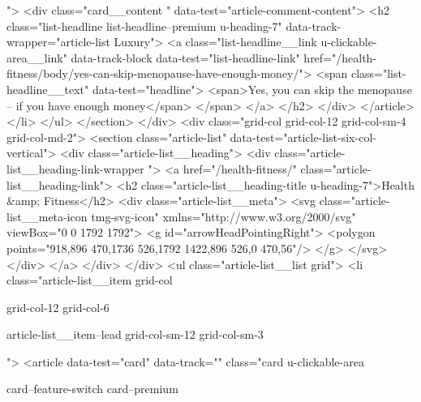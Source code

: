 {{{			 ">
<div class="card__content " data-test="article-comment-content">
<h2 class="list-headline list-headline--premium u-heading-7" data-track-wrapper="article-list Luxury">
<a class="list-headline__link u-clickable-area__link" data-track-block data-test="list-headline-link" href="/health-fitness/body/yes-can-skip-menopause-have-enough-money/">
<span class="list-headline__text" data-test="headline">
<span>Yes, you can skip the menopause – if you have enough money</span>
</span>
</a>
</h2>
</div>
</article>
</li>
</ul>
</section>
</div>
<div class="grid-col grid-col-12 grid-col-sm-4 grid-col-md-2">
<section class="article-list" data-test="article-list-six-col-vertical">
<div class="article-list__heading">
<div class="article-list__heading-link-wrapper
				">
<a href="/health-fitness/" class="article-list__heading-link">
<h2 class="article-list__heading-title u-heading-7">Health &amp; Fitness</h2>
<div class="article-list__meta">
<svg class="article-list__meta-icon  tmg-svg-icon" xmlns="http://www.w3.org/2000/svg" viewBox="0 0 1792 1792">
<g id="arrowHeadPointingRight">
<polygon points="918,896 470,1736 526,1792 1422,896 526,0 470,56"/>
</g>
</svg>
</div>
</a>
</div>
</div>
<ul class="article-list__list grid">
<li class="article-list__item
				grid-col
				
				
				
				grid-col-12
				grid-col-6
				
				
				
				
				article-list__item--lead grid-col-sm-12
				grid-col-sm-3
				
				
				">
<article data-test="card" data-track="" class="card
			u-clickable-area
			
			card--feature-switch
			card--premium
			
			
			
			
			
}}}
